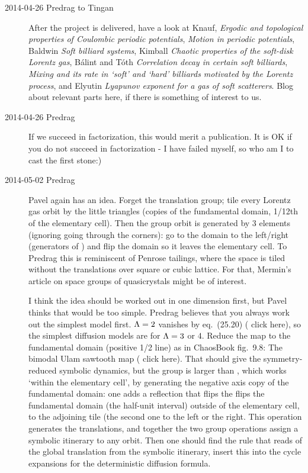 \begin{description}
\item[2014-04-26 Predrag to Tingan]
After the project is delivered,
have a look at
Knauf,
{\em Ergodic and topological properties of {Coulombic} periodic potentials},
{\em Motion in periodic potentials},
Baldwin {\em Soft billiard systems},
Kimball
{\em Chaotic properties of the soft-disk {Lorentz} gas},
B\'alint and T\'oth
{\em Correlation decay in certain soft billiards},
{\em Mixing and its rate in `soft' and `hard' billiards
         motivated by the {Lorentz} process},
and
Elyutin
{\em Lyapunov exponent for a gas of soft scatterers}.
Blog about relevant parts here, if there is something of interest
to us.

\item[2014-04-26 Predrag]
If we succeed in factorization, this would merit a publication.
It is OK if you do not succeed in factorization - I have failed myself, so
who am I to cast the first stone:)

\item[2014-05-02 Predrag]
Pavel again has an idea. Forget the translation group; tile every Lorentz
gas orbit by the little triangles (copies of the fundamental domain,
1/12th of the elementary cell). Then the group orbit is generated by 3
elements (ignoring going through the corners): go to the domain to the
left/right (generators of ) and flip the domain so it leaves the
elementary cell. To Predrag this is reminiscent of Penrose tailings,
where the space is tiled without the translations over square or cubic
lattice. For that, Mermin's article on space groups of
quasicrystals might be of interest.

I think the idea should be worked out in one dimension first, but Pavel
thinks that would be too simple. Predrag believes that you always work
out the simplest model first. $\Lambda =2$ vanishes by eq.~(25.20)
( {click
here}), so the simplest diffusion models are for $\Lambda =3$ or $4$.
Reduce the map to the fundamental domain (positive 1/2 line) as in
ChaosBook fig.~9.8: The bimodal Ulam sawtooth map
( {click
here}). That should give the symmetry-reduced symbolic dynamics, but the
group is larger than , which works `within the elementary cell', by
generating the negative axis copy of the fundamental domain: one adds a
reflection that flips the flips the fundamental domain (the half-unit
interval) outside of the elementary cell, to the adjoining tile (the
second one to the left or the right. This operation generates the
translations, and together the two group operations assign a symbolic
itinerary to any orbit. Then one should find the rule that reads of the
global translation from the symbolic itinerary, insert this into the
cycle expansions for the deterministic diffusion formula.


\end{description}
